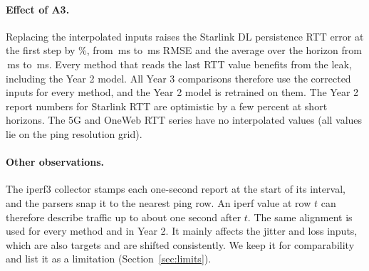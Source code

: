 \paragraph{Effect of A3.} Replacing the interpolated inputs raises the Starlink DL persistence RTT error at the first step by \AuditPersHonePct\%, from \AuditPersLegacyHone\,ms to \AuditPersCausalHone\,ms RMSE and the average over the horizon from \AuditPersLegacyAvg\,ms to \AuditPersCausalAvg\,ms. Every method that reads the last RTT value benefits from the leak, including the Year 2 model. All Year 3 comparisons therefore use the corrected inputs for every method, and the Year 2 model is retrained on them. The Year 2 report numbers for Starlink RTT are optimistic by a few percent at short horizons. The 5G and OneWeb RTT series have no interpolated values (all values lie on the ping resolution grid).

\paragraph{Other observations.} The iperf3 collector stamps each one-second report at the start of its interval, and the parsers snap it to the nearest ping row. An iperf value at row $t$ can therefore describe traffic up to about one second after $t$. The same alignment is used for every method and in Year 2. It mainly affects the jitter and loss inputs, which are also targets and are shifted consistently. We keep it for comparability and list it as a limitation (Section~\ref{sec:limits}).

